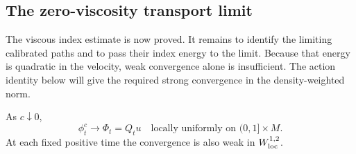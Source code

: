 \subsection{The zero-viscosity transport limit}

The viscous index estimate is now proved. It remains to identify the
limiting calibrated paths and to pass their index energy to the limit.
Because that energy is quadratic in the velocity, weak convergence
alone is insufficient. The action identity below will give the
required strong convergence in the density-weighted norm.

\begin{lemma}
\label{heat:laplace-principle}
As \(c\downarrow0\),
\begin{equation}
\label{heat:potential-limit}
\phi_t^c\longrightarrow\Phi_t=Q_tu
\quad\text{locally uniformly on }(0,1]\times M.
\end{equation}
At each fixed positive time the convergence is also weak in
\(W^{1,2}_{\rm loc}\).
\end{lemma}


